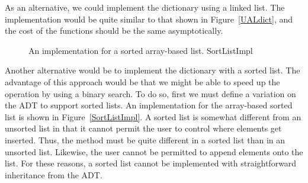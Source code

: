 As an alternative, we could implement the dictionary using a linked
list.
The implementation would be quite similar to that shown in
Figure~\ref{UALdict}, and the cost of the functions should be the same
asymptotically.

{\begin{figure}
\vspace{-\bigskipamount}
{An implementation for a sorted array-based list.}
{SortListImpl}
\end{figure}}{}

Another alternative would be to implement the dictionary with a sorted 
list.
The advantage of this approach would be that we might be able to speed 
up the  operation by using a binary search.
To do so, first we must define a variation on the  ADT to
support sorted lists.
{An implementation for the array-based sorted list is shown in
Figure~\ref{SortListImpl}.}{}
A sorted list is somewhat different from an unsorted list in that it
cannot permit the user to control where elements get inserted.
Thus, the  method must be quite different in a sorted
list than in an unsorted list.
Likewise, the user cannot be permitted to append elements onto the
list.
For these reasons, a sorted list cannot be implemented with
straightforward inheritance from the 
ADT.

